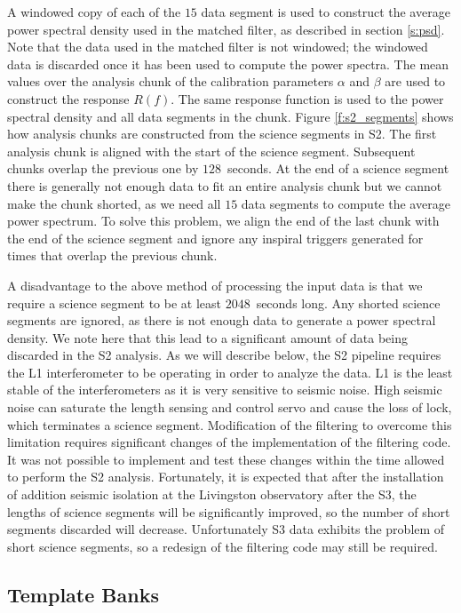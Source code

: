 A windowed copy of each of the $15$ data segment is used to construct the
average power spectral density used in the matched filter, as described in
section \ref{s:psd}. Note that the data used in the matched filter is not
windowed; the windowed data is discarded once it has been used to compute the
power spectra.  The mean values over the analysis chunk of the calibration
parameters $\alpha$ and $\beta$ are used to construct the response $R(f)$. The
same response function is used to the power spectral density and all data
segments in the chunk.  Figure \ref{f:s2_segments} shows how analysis chunks
are constructed from the science segments in S2. The first analysis chunk is
aligned with the start of the science segment. Subsequent chunks overlap the
previous one by $128$~seconds. At the end of a science segment there is
generally not enough data to fit an entire analysis chunk but we cannot make
the chunk shorted, as we need all $15$ data segments to compute the average
power spectrum. To solve this problem, we align the end of the last chunk with
the end of the science segment and ignore any inspiral triggers generated for
times that overlap the previous chunk. 

A disadvantage to the above method of processing the input data is that we
require a science segment to be at least $2048$~seconds long. Any shorted
science segments are ignored, as there is not enough data to generate a power
spectral density. We note here that this lead to a significant amount of data
being discarded in the S2 analysis. As we will describe below, the S2 pipeline
requires the L1 interferometer to be operating in order to analyze the data.
L1 is the least stable of the interferometers as it is very sensitive to
seismic noise. High seismic noise can saturate the length sensing and control
servo and cause the loss of lock, which terminates a science segment.
Modification of the filtering to overcome this limitation requires significant
changes of the implementation of the filtering code. It was not possible to
implement and test these changes within the time allowed to perform the S2
analysis. Fortunately, it is expected that after the installation of addition
seismic isolation at the Livingston observatory after the S3, the lengths of
science segments will be significantly improved, so the number of short
segments discarded will decrease. Unfortunately S3 data exhibits the
problem of short science segments, so a redesign of the filtering code may
still be required.

\subsection{Template Banks}
\label{ss:templatebank}

